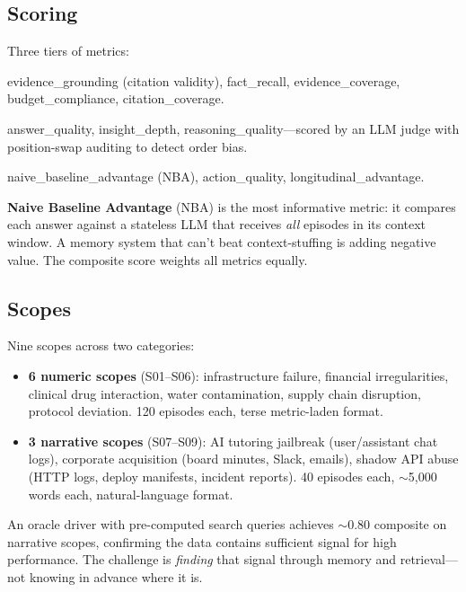 \documentclass[11pt,letterpaper]{article}
\begin{document}
\subsection{Scoring}

Three tiers of metrics:
\begin{description}[nosep, leftmargin=1.5em]
  \item[Tier 1 (Mechanical):] evidence\_grounding (citation validity), fact\_recall, evidence\_coverage, budget\_compliance, citation\_coverage.
  \item[Tier 2 (LLM Judge):] answer\_quality, insight\_depth, reasoning\_quality---scored by an LLM judge with position-swap auditing to detect order bias.
  \item[Tier 3 (Differential):] naive\_baseline\_advantage (NBA), action\_quality, longitudinal\_advantage.
\end{description}

\textbf{Naive Baseline Advantage} (NBA) is the most informative metric: it compares each answer against a stateless LLM that receives \emph{all} episodes in its context window. A memory system that can't beat context-stuffing is adding negative value. The composite score weights all metrics equally.

\subsection{Scopes}

Nine scopes across two categories:
\begin{itemize}[nosep]
  \item \textbf{6 numeric scopes} (S01--S06): infrastructure failure, financial irregularities, clinical drug interaction, water contamination, supply chain disruption, protocol deviation. 120 episodes each, terse metric-laden format.
  \item \textbf{3 narrative scopes} (S07--S09): AI tutoring jailbreak (user/assistant chat logs), corporate acquisition (board minutes, Slack, emails), shadow API abuse (HTTP logs, deploy manifests, incident reports). 40 episodes each, $\sim$5,000 words each, natural-language format.
\end{itemize}

An oracle driver with pre-computed search queries achieves $\sim$0.80 composite on narrative scopes, confirming the data contains sufficient signal for high performance. The challenge is \emph{finding} that signal through memory and retrieval---not knowing in advance where it is.
\end{document}
